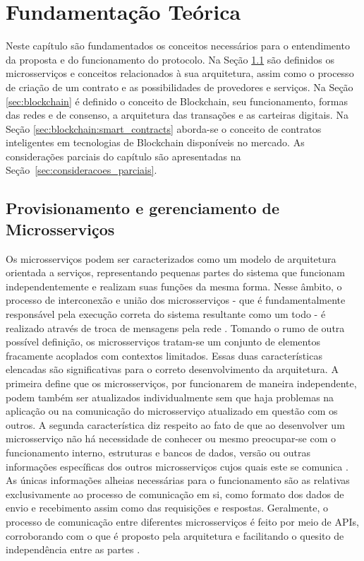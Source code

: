 \newcommand{\COMMENT}[1]{\noindent\fbox{\parbox{0.98\linewidth}{\bfseries #1}}}


\chapter{Fundamentação Teórica}
\label{ch:fundamentos}

Neste capítulo são fundamentados os conceitos necessários para o entendimento da proposta e do funcionamento do protocolo. Na Seção \ref{sec:microsservicos} são definidos os microsserviços e conceitos relacionados à sua arquitetura, assim como o processo de criação de um contrato e as possibilidades de provedores e serviços. Na Seção \ref{sec:blockchain} é definido o conceito de Blockchain, seu funcionamento, formas das redes e de consenso, a arquitetura das transações e as carteiras digitais. Na Seção \ref{sec:blockchain:smart_contracts} aborda-se o conceito de contratos inteligentes em tecnologias de Blockchain disponíveis no mercado.
As considerações parciais do capítulo são apresentadas na Seção~\ref{sec:consideracoes_parciais}.


\section{Provisionamento e gerenciamento de Microsserviços}
\label{sec:microsservicos}

Os microsserviços podem ser caracterizados como um modelo de arquitetura orientada a serviços, representando pequenas partes do sistema que funcionam independentemente e realizam suas funções da mesma forma. Nesse âmbito, o processo de interconexão e união dos microsserviços - que é fundamentalmente responsável pela execução correta do sistema resultante como um todo - é realizado através de troca de mensagens pela rede \cite{microsservicos:newman_microsservicos}.
%
Tomando o rumo de outra possível definição, os microsserviços tratam-se um conjunto de elementos fracamente acoplados com contextos limitados. Essas duas características elencadas são significativas para o correto desenvolvimento da arquitetura. 
%
A primeira define que os microsserviços, por funcionarem de maneira independente, podem também ser atualizados individualmente sem que haja problemas na aplicação ou na comunicação do microsserviço atualizado em questão com os outros.
%
A segunda característica diz respeito ao fato de que ao desenvolver um microsserviço não há necessidade de conhecer ou mesmo preocupar-se com o funcionamento interno, estruturas e bancos de dados, versão ou outras informações específicas dos outros microsserviços cujos quais este se comunica \cite{microsservicos:netflix}. As únicas informações alheias necessárias para o funcionamento são as relativas exclusivamente ao processo de comunicação em si, como formato dos dados de envio e recebimento assim como das requisições e respostas.
%
Geralmente, o processo de comunicação entre diferentes microsserviços é feito por meio de \acp{API}, corroborando com o que é proposto pela arquitetura e facilitando o quesito de independência entre as partes \cite{microsservicos:newman_microsservicos, microsservicos:empresas}.

